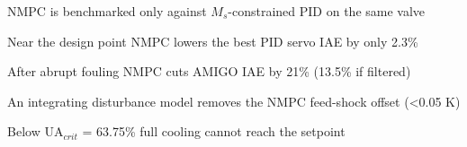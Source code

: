 \begin{highlights}
\item NMPC is benchmarked only against $M_s$-constrained PID on the same valve
\item Near the design point NMPC lowers the best PID servo IAE by only 2.3\%
\item After abrupt fouling NMPC cuts AMIGO IAE by 21\% (13.5\% if filtered)
\item An integrating disturbance model removes the NMPC feed-shock offset (<0.05 K)
\item Below UA$_{crit}$ = 63.75\% full cooling cannot reach the setpoint
\end{highlights}
